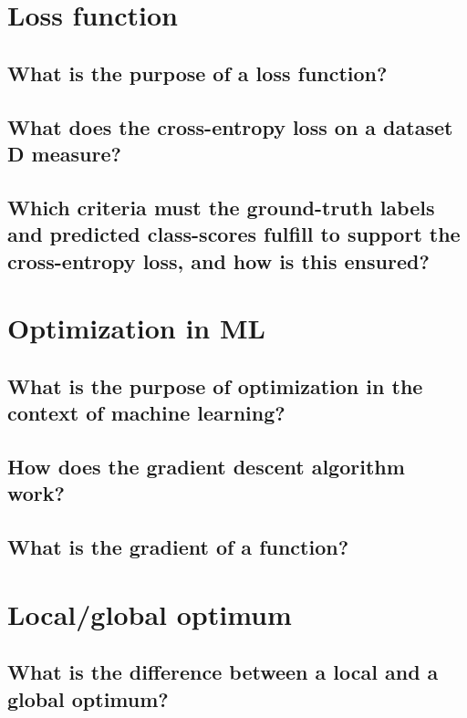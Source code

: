\section{Loss function}

\subsection{What is the purpose of a loss function?}

\subsection{What does the cross-entropy loss on a dataset D measure?}

\subsection{Which criteria must the ground-truth labels and predicted class-scores fulfill to support the cross-entropy loss, and how is this ensured?}

\section{Optimization in ML}

\subsection{What is the purpose of optimization in the context of machine learning?}

\subsection{How does the gradient descent algorithm work?}

\subsection{What is the gradient of a function? }

\section{Local/global optimum}

\subsection{What is the difference between a local and a global optimum?}

